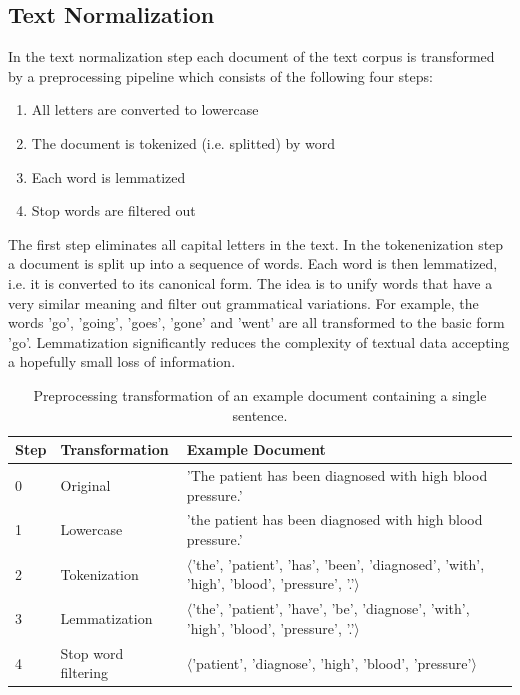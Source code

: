 \subsection{Text Normalization}

In the text normalization step each document of the text corpus is transformed by a preprocessing pipeline which consists of the following four steps:
\begin{enumerate} 
	\item All letters are converted to lowercase
	\item The document is tokenized (i.e. splitted) by word
	\item Each word is lemmatized
	\item Stop words are filtered out
\end{enumerate}
The first step eliminates all capital letters in the text.
In the tokenenization step a document is split up into a sequence of words.
Each word is then lemmatized, i.e. it is converted to its canonical form.
The idea is to unify words that have a very similar meaning and filter out grammatical variations.
For example, the words  'go', 'going', 'goes', 'gone' and 'went' are all transformed to the basic form 'go'.
Lemmatization significantly reduces the complexity of textual data accepting a hopefully small loss of information.

\begin{table}[!htbp]
	\begin{tabularx}{\textwidth}{l l p{9.8cm}}
		\toprule
		\textbf{Step} & \textbf{Transformation} & \textbf{Example Document}                                                       \\ \midrule
		0             & Original       & 'The patient has been diagnosed with high blood pressure.' \\
		1             & Lowercase               & 'the patient has been diagnosed with high blood pressure.' \\
		2 & Tokenization  & $\langle$'the', 'patient', 'has', 'been', 'diagnosed', 'with', 'high', 'blood', 'pressure', '.'$\rangle$ \\
		3 & Lemmatization & $\langle$'the', 'patient', 'have', 'be', 'diagnose', 'with', 'high', 'blood', 'pressure', '.'$\rangle$  \\
		4             & Stop word filtering     & $\langle$'patient', 'diagnose', 'high', 'blood', 'pressure'$\rangle$ \\ \bottomrule
	\end{tabularx}
	\caption[Preprocessing transformation of an example document]{Preprocessing transformation of an example document containing a single sentence.}
	\label{tab:text-preprocessing}
\end{table}

